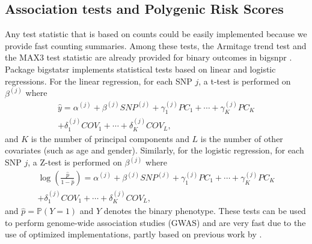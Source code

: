 \documentclass{bioinfo}
\begin{document}
\begin{methods}
\subsection{Association tests and Polygenic Risk Scores}

Any test statistic that is based on counts could be easily implemented because we provide fast counting summaries. Among these tests, the Armitage trend test and the MAX3 test statistic are already provided for binary outcomes in bigsnpr \cite[]{Zheng2012}. 
Package bigstatsr implements statistical tests based on linear and logistic regressions. For the linear regression, for each SNP $j$, a t-test is performed on $\beta^{(j)}$ where
\begin{multline}
  \hat{y} = \alpha^{(j)} + \beta^{(j)} SNP^{(j)} + \gamma_1^{(j)} PC_1 + \cdots + \gamma_K^{(j)} PC_K \\ + \delta_1^{(j)} COV_1 + \cdots + \delta_K^{(j)} COV_L,
\end{multline}
and $K$ is the number of principal components and $L$ is the number of other covariates (such as age and gender). Similarly, for the logistic regression, for each SNP $j$, a Z-test is performed on $\beta^{(j)}$ where
\begin{multline}
  \log{\left(\frac{\hat{p}}{1-\hat{p}}\right)} = \alpha^{(j)} + \beta^{(j)} SNP^{(j)} + \gamma_1^{(j)} PC_1 + \cdots + \gamma_K^{(j)} PC_K \\ + \delta_1^{(j)} COV_1 + \cdots + \delta_K^{(j)} COV_L,
\end{multline}
and $\hat{p} = \mathbb{P}(Y = 1)$ and $Y$ denotes the binary phenotype.
{\color{red}
These tests can be used to perform genome-wide association studies (GWAS) and are very fast due to the use of optimized implementations, partly based on previous work by \cite{sikorska2013gwas}. 
}


\end{methods}
\end{document}
